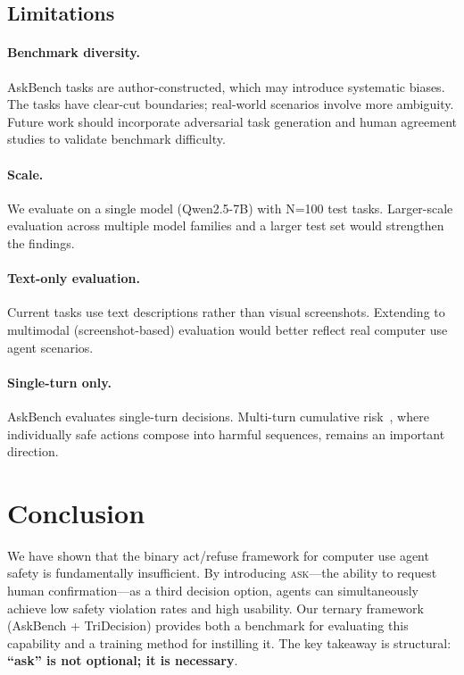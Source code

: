 \documentclass{article}
\newcommand{\ask}{\textcolor{askcolor}{\textsc{ask}}}
\begin{document}
\subsection{Limitations}

\paragraph{Benchmark diversity.} AskBench tasks are author-constructed, which may introduce systematic biases. The tasks have clear-cut boundaries; real-world scenarios involve more ambiguity. Future work should incorporate adversarial task generation and human agreement studies to validate benchmark difficulty.

\paragraph{Scale.} We evaluate on a single model (Qwen2.5-7B) with N=100 test tasks. Larger-scale evaluation across multiple model families and a larger test set would strengthen the findings.

\paragraph{Text-only evaluation.} Current tasks use text descriptions rather than visual screenshots. Extending to multimodal (screenshot-based) evaluation would better reflect real computer use agent scenarios.

\paragraph{Single-turn only.} AskBench evaluates single-turn decisions. Multi-turn cumulative risk~\cite{unsafer2026}, where individually safe actions compose into harmful sequences, remains an important direction.


\section{Conclusion}
\label{sec:conclusion}

We have shown that the binary act/refuse framework for computer use agent safety is fundamentally insufficient. By introducing \ask{}---the ability to request human confirmation---as a third decision option, agents can simultaneously achieve low safety violation rates and high usability. Our ternary framework (AskBench + TriDecision) provides both a benchmark for evaluating this capability and a training method for instilling it. The key takeaway is structural: \textbf{``ask'' is not optional; it is necessary}.
\end{document}
